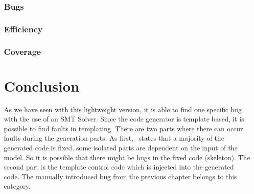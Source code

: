 \subsubsection{Bugs}

\subsubsection{Efficiency}

\subsubsection{Coverage}

\section{Conclusion}

As we have seen with this lightweight version, it is able to find one specific bug with the use of an SMT Solver. Since the code generator is template based, it is possible to find faults in templating. There are two parts where there can occur faults during the generation parts. As first,~\cite[p.274]{voelter2013dsl} states that a majority of the generated code is fixed, some isolated parts are dependent on the input of the model. So it is possible that there might be bugs in the fixed code (skeleton). The second part is the template control code which is injected into the generated code. The manually introduced bug from the previous chapter belongs  to this category.



